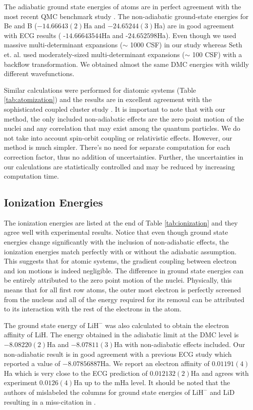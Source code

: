 \documentclass[aps,prl,superscriptaddress,groupedaddress]{revtex4}
\begin{document}
The adiabatic ground state energies of atoms are in perfect agreement with the most recent QMC benchmark study \cite{Seth_Bench}. The non-adiabatic ground-state energies for Be and B ($-14.66643(2)$Ha and $-24.65244(3)$Ha) are in good agreement with ECG results ( -$14.66643544$Ha \cite{Bubin_BeH_noBO} and -$24.652598$Ha\cite{Bubin_BH_noBO}). Even though we used massive multi-determinant expansions ($\sim$ 1000 CSF) in our study whereas Seth et. al. \cite{Seth_Bench} used moderately-sized multi-determinant expansions ($\sim$ 100 CSF) with a backflow transformation. We obtained almost the same DMC energies with wildly different wavefunctions.

Similar calculations were performed for diatomic systems (Table \ref{tab:atomization}) and the results are in excellent agreement with the sophisticated coupled cluster study \cite{Feller_Corrections}. It is important to note that with our method, the only included non-adiabatic effects are the zero point motion of the nuclei and any correlation that may exist among the quantum particles. We do not take into account spin-orbit coupling or relativistic effects. However, our method is much simpler. There's no need for separate computation for each correction factor, thus no addition of uncertainties. Further, the uncertainties in our calculations are statistically controlled and may be reduced by increasing computation time. 

\subsection{Ionization Energies}
The ionization energies are listed at the end of Table \ref{tab:ionization} and they agree well with experimental results. Notice that even though ground state energies change significantly with the inclusion of non-adiabatic effects, the ionization energies match perfectly with or without the adiabatic assumption. This suggests that for atomic systems, the gradient coupling between electron and ion motions is indeed negligible. The difference in ground state energies can be entirely attributed to the zero point motion of the nuclei. Physically, this means that for all first row atoms, the outer most electron is perfectly screened from the nucleus and all of the energy required for its removal can be attributed to its interaction with the rest of the electrons in the atom.

The ground state energy of $\text{LiH}^-$ was also calculated to obtain the electron affinity of LiH. The energy obtained in the adiabatic limit at the DMC level is $-8.08220(2)$Ha and $-8.07811(3)$Ha with non-adiabatic effects included. Our non-adiabatic result is in good agreement with a previous ECG study \cite{Bubin_LiH_noBO} which reported a value of $-8.07856887$Ha. We report an electron affinity of $0.01191(4)$Ha which is very close to the ECG prediction of $0.012132(2)$Ha and agrees with experiment $0.0126(4)$Ha up to the mHa level. It should be noted that the authors of \cite{Bubin_LiH_noBO} mislabeled the columns for ground state energies of $\text{LiH}^-$ and LiD resulting in a miss-citation in \cite{Mitroy_ECG}.
\end{document}
